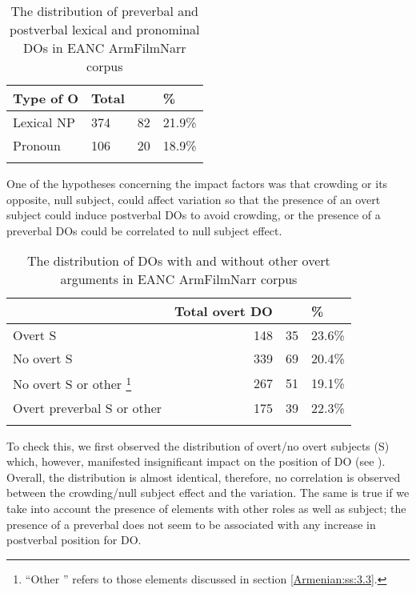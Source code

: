 \documentclass[output=paper,colorlinks,citecolor=brown,draftmode]{langscibook}
\begin{document}
\begin{table}
    \begin{tabularx}{\textwidth}{lYYY}
\lsptoprule
Type of O & Total &  & \%  \\
\midrule
Lexical NP&374&82&21.9\% \\
Pronoun&106&20&18.9\% \\
\lspbottomrule
    \end{tabularx}
    \caption{The distribution of preverbal and postverbal lexical and pronominal DOs in EANC ArmFilmNarr corpus}
    \label{Armenian:tab:11}
\end{table}

 One of the hypotheses concerning the impact factors was that  crowding or its opposite, null subject, could affect  variation so that the presence of an overt subject could induce postverbal DOs to avoid crowding, or the presence of a preverbal DOs could be correlated to null subject effect.

\begin{table}
    \begin{tabularx}{\textwidth}{lrYY}
\lsptoprule
& Total overt DO &  & \%  \\
\midrule
Overt S&148&35&23.6\% \\
No overt S&339&69&20.4\% \\
No overt S or other \footnote{``Other '' refers to those elements discussed in section \ref{Armenian:ss:3.3}.} &267&51&19.1\% \\
Overt preverbal S or other &175&39&22.3\% \\
\lspbottomrule
    \end{tabularx}
    \caption{The distribution of DOs with and without other overt arguments in EANC ArmFilmNarr corpus}
    \label{Armenian:tab:12}
\end{table}

To check this, we first observed the distribution of overt/no overt subjects (S) which, however, manifested insignificant impact on the position of DO (see ). Overall, the distribution is almost identical, therefore, no correlation is observed between the crowding/null subject effect and the  variation. The same is true if we take into account the presence of elements with other roles as well as subject; the presence of a preverbal  does not seem to be associated with any increase in postverbal position for DO.
\end{document}
